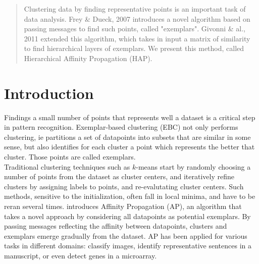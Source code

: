 \documentclass{ipol}
\begin{document}
\begin{abstract}

Clustering data by finding representative points is an important task of data
analysis. Frey \& Dueck, 2007 \cite{frey07affinitypropagation} introduces a
novel algorithm based on passing messages to find such points, called
"exemplars". Givonni \& al., 2011 \cite{hap} extended this algorithm, which
takes in input a matrix of similarity to find hierarchical layers of
exemplars. We present this method, called Hierarchical Affinity Propagation
(HAP).

\end{abstract}

\begin{ipolCode}
\end{ipolCode}

\begin{ipolSupp}
\end{ipolSupp}

\section{Introduction}

Findings a small number of points that represents well a dataset is a critical
step in pattern recognition. Exemplar-based clustering (EBC) not only performs
clustering, ie partitions a set of datapoints into subsets that are similar in
some sense, but also identifies for each cluster a point which represents the
better that cluster. Those points are called exemplars.\\

Traditional clustering techniques such as $k$-means start by randomly choosing
a number of points from the dataset as cluster centers, and iteratively refine
clusters by assigning labels to points, and re-evalutating cluster centers.
Such methods, sensitive to the initialization, often fall in local minima, and
have to be reran several times. \cite{frey07affinitypropagation} introduces
Affinity Propagation (AP), an algorithm that takes a novel approach by
considering all datapoints as potential exemplars. By passing messages
reflecting the affinity between datapoints, clusters and exemplars emerge
gradually from the dataset. AP has been applied for various tasks in different
domains: classify images, identify representative sentences in a manuscript,
or even detect genes in a microarray.\\
\end{document}
